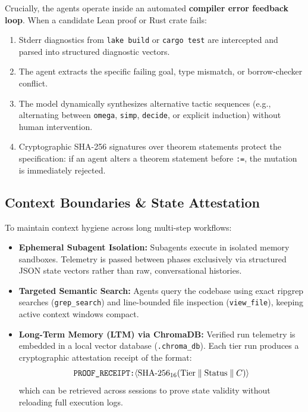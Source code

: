 \documentclass[10pt,twocolumn,letterpaper]{article}
\theoremstyle{definition}
\begin{document}
Crucially, the agents operate inside an automated \textbf{compiler error feedback loop}. When a candidate Lean proof or Rust crate fails:
\begin{enumerate}
    \item Stderr diagnostics from \texttt{lake build} or \texttt{cargo test} are intercepted and parsed into structured diagnostic vectors.
    \item The agent extracts the specific failing goal, type mismatch, or borrow-checker conflict.
    \item The model dynamically synthesizes alternative tactic sequences (e.g., alternating between \texttt{omega}, \texttt{simp}, \texttt{decide}, or explicit induction) without human intervention.
    \item Cryptographic SHA-256 signatures over theorem statements protect the specification: if an agent alters a theorem statement before \texttt{:=}, the mutation is immediately rejected.
\end{enumerate}

\subsection{Context Boundaries \& State Attestation}
\label{sec:context_management}
To maintain context hygiene across long multi-step workflows:
\begin{itemize}
    \item \textbf{Ephemeral Subagent Isolation:} Subagents execute in isolated memory sandboxes. Telemetry is passed between phases exclusively via structured JSON state vectors rather than raw, conversational histories.
    \item \textbf{Targeted Semantic Search:} Agents query the codebase using exact ripgrep searches (\texttt{grep\_search}) and line-bounded file inspection (\texttt{view\_file}), keeping active context windows compact.
    \item \textbf{Long-Term Memory (LTM) via ChromaDB:} Verified run telemetry is embedded in a local vector database (\texttt{.chroma\_db}). Each tier run produces a cryptographic attestation receipt of the format:
    \begin{equation}
        \text{\texttt{PROOF\_RECEIPT:}}\langle \text{SHA-256}_{16}(\text{Tier} \parallel \text{Status} \parallel C) \rangle
    \end{equation}
    which can be retrieved across sessions to prove state validity without reloading full execution logs.
\end{itemize}
\end{document}
